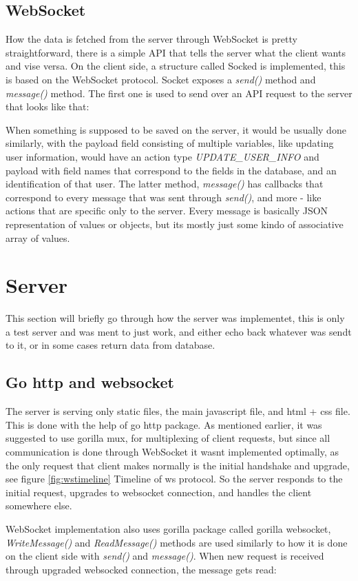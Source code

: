 \subsection{WebSocket}\label{sec:websocket}
How the data is fetched from the server through WebSocket is pretty straightforward, there is a simple API that tells the server what the client wants and vise versa. On the client side, a structure called Socked is implemented, this is based on the WebSocket protocol. Socket exposes a \emph{send()} method and \emph{message()} method. The first one is used to send over an API request to the server that looks like that:

When something is supposed to be saved on the server, it would be usually done similarly, with the payload field consisting of multiple variables, like updating user information, would have an action type \emph{UPDATE\_USER\_INFO} and payload with field names that correspond to the fields in the database, and an identification of that user. The latter method, \emph{message()} has callbacks that correspond to every message that was sent through \emph{send()}, and more - like actions that are specific only to the server. Every message is basically JSON representation of values or objects, but its mostly just some kindo of associative array of values.

\section{Server}
This section will briefly go through how the server was implementet, this is only a test server and was ment to just work, and either echo back whatever was sendt to it, or in some cases return data from database.
\subsection{Go http and websocket}
The server is serving only static files, the main javascript file, and html + css file. This is done with the help of go http package. As mentioned earlier, it was suggested to use gorilla mux, for multiplexing of client requests, but since all communication is done through WebSocket it wasnt implemented optimally, as the only request that client makes normally is the initial handshake and upgrade, see figure \ref{fig:wstimeline} Timeline of ws protocol. So the server responds to the initial request, upgrades to websocket connection, and handles the client somewhere else.

WebSocket implementation also uses gorilla package called gorilla websocket, \emph{WriteMessage()} and \emph{ReadMessage()} methods are used similarly to how it is done on the client side with \emph{send()} and \emph{message()}. When new request is received through upgraded websocked connection, the message gets read: 


